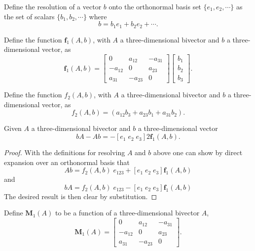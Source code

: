 \begin{definition}
Define the resolution of a vector $b$ onto the orthonormal basis
set $\{e_{1}, e_{2}, \cdots\}$ as the set of scalars $\{b_{1}, b_{2}, \cdots\}$ where
\[b = b_1e_1 + b_2e_2 + \cdots.\]
\end{definition}

\begin{definition}
Define the function $\mathbf{f}_1(A,b)$,
       with $A$ a three-dimensional
bivector and $b$ a three-dimensional vector,
as
\[
\mathbf{f}_1(A,b) =
\left[ 
\begin{array}{ccc}
0 & a_{12} & - a_{31} \\
- a_{12} & 0 & a_{23}\\
a_{31} & - a_{23} & 0 
\end{array} 
\right]  
\left[ 
\begin{array}{c}
b_1 \\ b_2 \\ b_3
\end{array} 
\right].\]
\end{definition}

\begin{definition}
Define the function $f_2(A,b)$,
       with $A$ a three-dimensional
bivector and $b$ a three-dimensional vector,
       as
\[
f_2(A,b) = (a_{12}b_{3} + a_{23}b_1 + a_{31}b_2).
\]
\end{definition}

\begin{cor}
\label{lem:ABandBA}
Given  $A$ a three-dimensional
bivector and $b$ a three-dimensional vector
\[
bA - Ab = -
\left[ e_1 \; e_2 \; e_3 \right]
2\mathbf{f}_1(A,b).
\]
\begin{proof}
With the definitions for resolving $A$ and $b$ above one can show by direct expansion
over an orthonormal basis that
\[
Ab =
f_2(A,b)\;e_{123} +
\left[ e_1 \; e_2 \; e_3 \right]
 \mathbf{f}_1(A,b)
\]
and
\[
bA =
f_2(A,b)\;e_{123} - 
\left[ e_1 \; e_2 \; e_3 \right]
\mathbf{f}_1(A,b)
\]
The desired result is then clear by substitution.
\end{proof}
\end{cor}

\begin{definition}
Define $\mathbf{M}_1(A)$ to be a function of a three-dimensional bivector $A$,
\[
\mathbf{M}_1(A) = \left[ 
\begin{array}{ccc}
0 & a_{12} & - a_{31} \\
- a_{12} & 0 & a_{23}\\
a_{31} & - a_{23} & 0 
\end{array} 
\right].
\]
\end{definition}

